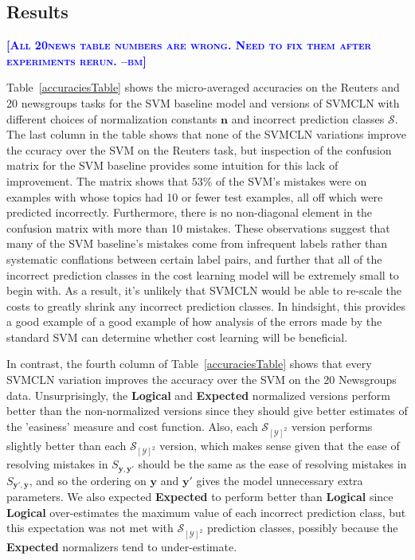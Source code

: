 \documentclass{article} %
\newcommand{\bmcomment}[1]{\textcolor{blue}{\textsc{\textbf{[#1 --bm]}}}}
\begin{document}
\subsection{Results}

\bmcomment{All 20news table numbers are wrong.  Need to fix them after experiments rerun.}

Table~\ref{accuraciesTable} shows the micro-averaged
accuracies on the Reuters and 20 newsgroups tasks for the 
SVM baseline model and versions of SVMCLN with
different choices of normalization constants 
$\mathbf{n}$ and incorrect prediction classes $\mathcal{S}$.  The last column 
in the table shows that none of the SVMCLN variations improve the
 ccuracy over the SVM on the Reuters task, but inspection of the 
confusion matrix for the SVM
baseline provides some intuition for this lack of improvement.  
The matrix shows
that $53\%$ of the SVM's mistakes were on examples with whose topics had 10 or
fewer test examples, all off which were predicted incorrectly.  Furthermore,
there is no non-diagonal element in the confusion matrix with more than 10 
mistakes.  These observations suggest that many of the SVM baseline's mistakes
come from infrequent labels rather than systematic conflations between certain
label pairs, and further that all of the incorrect prediction classes in the
cost learning model will be extremely small to begin with.  As a result, it's
unlikely that SVMCLN would be able to re-scale the costs to greatly shrink
any incorrect prediction classes.  In hindsight, this provides a good example
of a good example of how analysis of the errors made by the standard SVM can
determine whether cost learning will be beneficial.

In contrast, the fourth column of Table~\ref{accuraciesTable} shows that 
every SVMCLN variation improves the accuracy over the SVM on the 20 Newsgroups 
data.  Unsurprisingly, the \textbf{Logical} 
and \textbf{Expected} normalized versions
perform better than the non-normalized versions since they should give better
estimates of the 'easiness' measure and cost function.  Also, each 
$\mathcal{S}_{[\mathcal{Y}]^2}$ version performs slightly better than 
each $\mathcal{S}_{[\mathcal{Y}]^2}$ version, which makes sense given that
the ease of resolving mistakes in $S_{\mathbf{y},\mathbf{y}'}$ should be 
the same as the ease of resolving mistakes in $S_{\mathbf{y}',\mathbf{y}}$,
and so the ordering on $\mathbf{y}$ and $\mathbf{y}'$ gives the model
unnecessary extra parameters.  We also expected 
\textbf{Expected} to perform better 
than \textbf{Logical} since \textbf{Logical} 
over-estimates the maximum value of each incorrect prediction class, but
this expectation was not met with 
$\mathcal{S}_{[\mathcal{Y}]^2}$ prediction
classes, possibly because the \textbf{Expected} normalizers tend 
to under-estimate.
\end{document}
